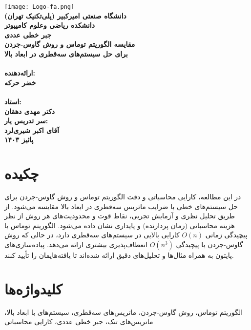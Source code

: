 \documentclass[a4paper,12pt]{article}
\begin{document}
\begin{titlepage}
    \centering
    \texttt{[image: Logo-fa.png]} \\[1cm]
    \textbf{\Large{دانشگاه صنعتی امیرکبیر (پلی‌تکنیک تهران)}} \\[0.5cm]
    \textbf{\Large{دانشکده ریاضی وعلوم کامپیوتر}} \\[0.5cm]
    \textbf{\Large{جبر خطی عددی}} \\[0.5cm]
    \textbf{\huge{مقایسه الگوریتم توماس و روش گاوس-جردن}} \\[0.5cm]
    \textbf{\huge{برای حل سیستم‌های سه‌قطری در ابعاد بالا}} \\[0.5cm]
    \textbf{\Large{}} \\[0.8cm]
    \textbf{\Large{ارائه‌دهنده:}} \\[0.2cm]
    \textbf{\large{خضر حرکه}} \\[1cm]
    \textbf{\Large{}} \\[0.2cm]
    \textbf{\Large{استاد:}} \\[0.2cm]
    \textbf{\large{دکتر مهدی دهقان}} \\[1cm]
    \textbf{\Large{سر تدریس یار:}} \\[0.2cm]
    \textbf{\large{آقای اکبر شیری‌لرد}} \\[1cm]  
    \textbf{\Large{پائیز ۱۴۰۳}}
\end{titlepage}

\newpage
{}
\setcounter{page}{1}

\section*{چکیده}
در این مطالعه، کارایی محاسباتی و دقت الگوریتم توماس و روش گاوس-جردن برای حل سیستم‌های خطی با ضرایب ماتریس سه‌قطری در ابعاد بالا مقایسه می‌شود. از طریق تحلیل نظری و آزمایش تجربی، نقاط قوت و محدودیت‌های هر روش از نظر هزینه محاسباتی (زمان پردازنده) و پایداری نشان داده می‌شود. الگوریتم توماس با پیچیدگی زمانی \(O(n)\) کارایی بالایی در سیستم‌های سه‌قطری دارد، در حالی که روش گاوس-جردن با پیچیدگی \(O(n^3)\) انعطاف‌پذیری بیشتری ارائه می‌دهد. پیاده‌سازی‌های پایتون به همراه مثال‌ها و تحلیل‌های دقیق ارائه شده‌اند تا یافته‌هایمان را تأیید کنند.

\section*{کلیدواژه‌ها}
الگوریتم توماس، روش گاوس-جردن، ماتریس‌های سه‌قطری، سیستم‌های با ابعاد بالا، ماتریس‌های تنک، جبر خطی عددی، کارایی محاسباتی
\end{document}
